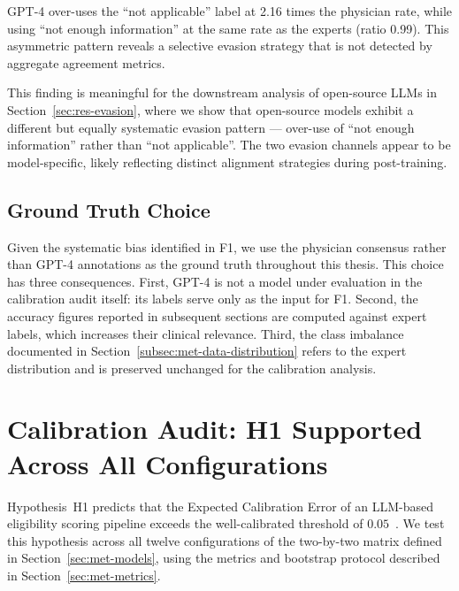 \begin{finding}
    GPT-4 over-uses the ``not applicable'' label at 2.16 times the 
    physician rate, while using ``not enough information'' at the same 
    rate as the experts (ratio 0.99). This asymmetric pattern reveals a 
    selective evasion strategy that is not detected by aggregate 
    agreement metrics.
\end{finding}

This finding is meaningful for the downstream analysis of open-source 
LLMs in Section~\ref{sec:res-evasion}, where we show that open-source 
models exhibit a different but equally systematic evasion pattern --- 
over-use of ``not enough information'' rather than ``not applicable''. 
The two evasion channels appear to be model-specific, likely reflecting 
distinct alignment strategies during post-training.

\subsection{Ground Truth Choice}
\label{subsec:res-audit-choice}

Given the systematic bias identified in F1, we use the physician 
consensus rather than GPT-4 annotations as the ground truth throughout 
this thesis. This choice has three consequences. First, GPT-4 is not a 
model under evaluation in the calibration audit itself: its labels serve 
only as the input for F1. Second, the accuracy figures reported in 
subsequent sections are computed against expert labels, which increases 
their clinical relevance. Third, the class imbalance documented in 
Section~\ref{subsec:met-data-distribution} refers to the expert 
distribution and is preserved unchanged for the calibration analysis.
\section{Calibration Audit: H1 Supported Across All Configurations}
\label{sec:res-h1}

Hypothesis~H1 predicts that the Expected Calibration Error of an LLM-based 
eligibility scoring pipeline exceeds the well-calibrated threshold of 
$0.05$~\cite{vancalster2019calibration}. We test this hypothesis across all 
twelve configurations of the two-by-two matrix defined in 
Section~\ref{sec:met-models}, using the metrics and bootstrap protocol 
described in Section~\ref{sec:met-metrics}.

